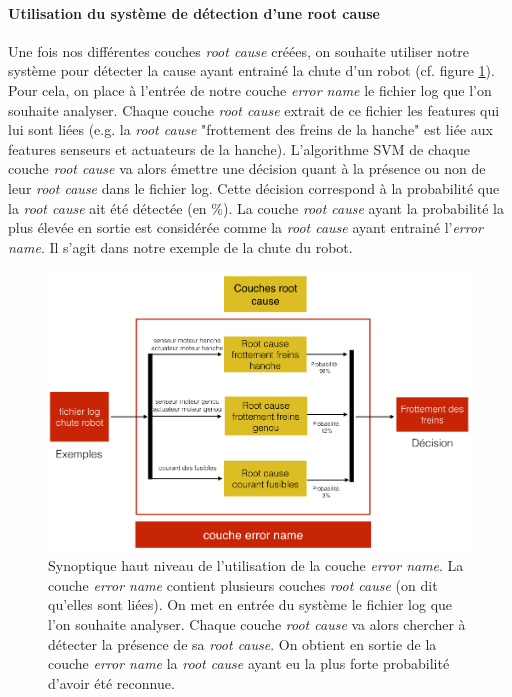 \paragraph{Utilisation du système de détection d'une root cause}
Une fois nos différentes couches \emph{root cause} créées, on souhaite utiliser notre système pour détecter la cause ayant entrainé la chute d'un robot (cf. figure \ref{fig:utilisation de la couche error name}). Pour cela, on place à l'entrée de notre couche \emph{error name} le fichier log que l'on souhaite analyser. Chaque couche \emph{root cause} extrait de ce fichier les features qui lui sont liées (e.g. la \emph{root cause} "frottement des freins de la hanche" est liée aux features senseurs et actuateurs de la hanche). L'algorithme SVM de chaque couche \emph{root cause} va alors émettre une décision quant à la présence ou non de leur \emph{root cause} dans le fichier log. Cette décision correspond à la probabilité que la \emph{ root cause} ait été détectée (en \%). La couche \emph{root cause} ayant la probabilité la plus élevée en sortie est considérée comme la \emph{root cause} ayant entrainé l'\emph{error name}. Il s'agit dans notre exemple de la chute du robot.

\begin{figure}[h]
	\centering\includegraphics[width=15cm]{images/synoptique_error.png}
	\caption[Utilisation de la couche error name]{Synoptique haut niveau de l'utilisation de la couche \emph{error name}. La couche \emph{error name} contient plusieurs couches \emph{root cause} (on dit qu'elles sont liées). On met en entrée du système le fichier log que l'on souhaite analyser. Chaque couche \emph{root cause} va alors chercher à détecter la présence de sa \emph{root cause}. On obtient en sortie de la couche \emph{error name} la \emph{root cause}  ayant eu la plus forte probabilité d'avoir été reconnue.}
	\label{fig:utilisation de la couche error name}
\end{figure}


